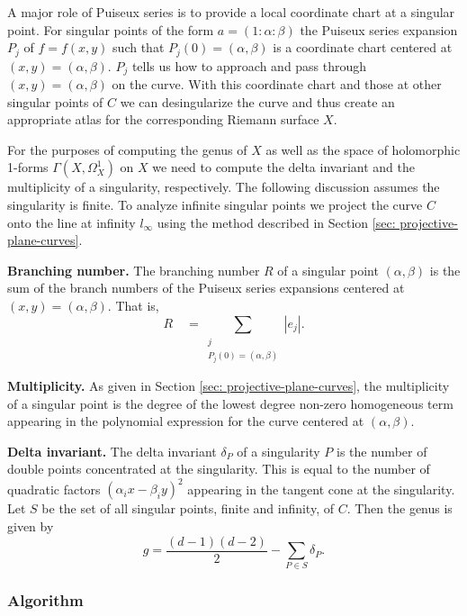 A major role of Puiseux series is to provide a local coordinate chart at a
singular point. For singular points of the form $a = (1 : \alpha : \beta)$ the
Puiseux series expansion $P_j$ of $f = f(x,y)$ such that $P_j(0) = (\alpha,
\beta)$ is a coordinate chart centered at $(x,y) = (\alpha, \beta)$. $P_j$ tells
us how to approach and pass through $(x,y) = (\alpha, \beta)$ on the curve. With
this coordinate chart and those at other singular points of $C$ we can
desingularize the curve and thus create an appropriate atlas for the
corresponding Riemann surface $X$.

For the purposes of computing the genus of $X$ as well as the space of
holomorphic 1-forms $\Gamma(X,\Omega_X^1)$ on $X$ we need to compute the delta
invariant and the multiplicity of a singularity, respectively. The following
discussion assumes the singularity is finite. To analyze infinite singular
points we project the curve $C$ onto the line at infinity $l_\infty$ using the
method described in Section \ref{sec: projective-plane-curves}.

{\bf Branching number.} The branching number $R$ of a singular point
$(\alpha,\beta)$ is the sum of the branch numbers of the Puiseux series
expansions centered at $(x,y) = (\alpha,\beta)$. That is,
\[
  R \quad = \sum_{\substack{j \\ P_j(0)=(\alpha,\beta)}} |e_j|.
\]

{\bf Multiplicity.} As given in Section \ref{sec: projective-plane-curves}, the
multiplicity of a singular point is the degree of the lowest degree non-zero
homogeneous term appearing in the polynomial expression for the curve centered
at $(\alpha, \beta)$.

{\bf Delta invariant.} The delta invariant $\delta_P$ of a singularity $P$ is
the number of double points concentrated at the singularity. This is equal to
the number of quadratic factors $(\alpha_i x - \beta_i y)^2$ appearing in the
tangent cone at the singularity. Let $S$ be the set of all singular points,
finite and infinity, of $C$. Then the genus is given by
\begin{equation} \label{eqn: genus-formula}
  g = \frac{(d-1)(d-2)}{2} - \sum_{P \in S} \delta_P.
\end{equation}


%
\subsubsection*{Algorithm}
%

